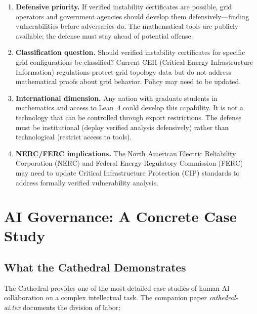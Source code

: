 \documentclass[11pt,a4paper]{article}
\begin{document}
\begin{enumerate}
  \item \textbf{Defensive priority.} If verified instability
    certificates are possible, grid operators and government agencies
    should develop them defensively---finding vulnerabilities before
    adversaries do. The mathematical tools are publicly available;
    the defense must stay ahead of potential offense.

  \item \textbf{Classification question.} Should verified
    instability certificates for specific grid configurations be
    classified? Current CEII (Critical Energy Infrastructure
    Information) regulations protect grid topology data but do not
    address mathematical proofs about grid behavior. Policy may
    need to be updated.

  \item \textbf{International dimension.} Any nation with graduate
    students in mathematics and access to Lean~4 could develop
    this capability. It is not a technology that can be controlled
    through export restrictions. The defense must be institutional
    (deploy verified analysis defensively) rather than technological
    (restrict access to tools).

  \item \textbf{NERC/FERC implications.} The North American Electric
    Reliability Corporation (NERC) and Federal Energy Regulatory
    Commission (FERC) may need to update Critical Infrastructure
    Protection (CIP) standards to address formally verified
    vulnerability analysis.
\end{enumerate}

\section{AI Governance: A Concrete Case Study}
\label{sec:ai}

\subsection{What the Cathedral Demonstrates}

The Cathedral provides one of the most detailed case studies of
human-AI collaboration on a complex intellectual task. The companion
paper \emph{cathedral-ai.tex} documents the division of labor:
\end{document}
